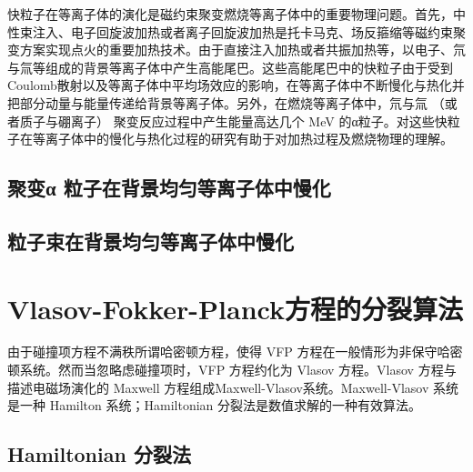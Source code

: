 快粒子在等离子体的演化是磁约束聚变燃烧等离子体中的重要物理问题。首先，中性束注入、电子回旋波加热或者离子回旋波加热是托卡马克、场反箍缩等磁约束聚变方案实现点火的重要加热技术。由于直接注入加热或者共振加热等，以电子、氘与氚等组成的背景等离子体中产生高能尾巴。这些高能尾巴中的快粒子由于受到Coulomb散射以及等离子体中平均场效应的影响，在等离子体中不断慢化与热化并把部分动量与能量传递给背景等离子体。另外，在燃烧等离子体中，氘与氚 （或者质子与硼离子） 聚变反应过程中产生能量高达几个 MeV 的α粒子。对这些快粒子在等离子体中的慢化与热化过程的研究有助于对加热过程及燃烧物理的理解。

\section{聚变α 粒子在背景均匀等离子体中慢化}

\section{粒子束在背景均匀等离子体中慢化}











\chapter{Vlasov-Fokker-Planck方程的分裂算法}

  由于碰撞项方程不满秩所谓哈密顿方程，使得 VFP 方程在一般情形为非保守哈密顿系统。然而当忽略虑碰撞项时，VFP 方程约化为 Vlasov 方程。Vlasov 方程与描述电磁场演化的 Maxwell 方程组成Maxwell-Vlasov系统。Maxwell-Vlasov 系统是一种 Hamilton 系统；Hamiltonian 分裂法是数值求解的一种有效算法。
  
\section{Hamiltonian 分裂法}

